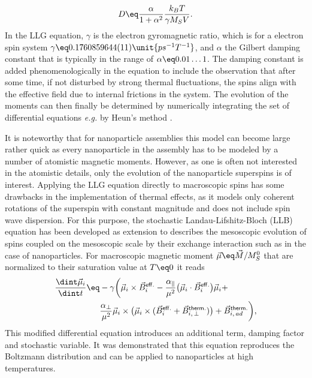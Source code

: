 \documentclass[\main/dresen_thesis.tex]{subfiles}
\begin{document}
      \begin{align}
        D \eq \frac{\alpha}{1 + \alpha^2} \frac{k_B T}{\gamma M_S V}.
      \end{align}
      In the LLG equation, $\gamma$ is the electron gyromagnetic ratio, which is for a electron spin system $\gamma \eq 0.1760859644(11) \unit{ps^{-1} T^{-1}}$, and $\alpha$ the Gilbert damping constant that is typically in the range of $\alpha \eq 0.01 \ldots 1$.
      The damping constant is added phenomenologically in the equation to include the observation that after some time, if not disturbed by strong thermal fluctuations, the spins align with the effective field due to internal frictions in the system.
      The evolution of the moments can then finally be determined by numerically integrating the set of differential equations \textit{e.g.} by Heun's method \cite{Sueli_2003_Anint}.

      It is noteworthy that for nanoparticle assemblies this model can become large rather quick as every nanoparticle in the assembly has to be modeled by a number of atomistic magnetic moments.
      However, as one is often not interested in the atomistic details, only the evolution of the nanoparticle superspins is of interest.
      Applying the LLG equation directly to macroscopic spins has some drawbacks in the implementation of thermal effects, as it models only coherent rotations of the superspin with constant magnitude and does not include spin wave dispersion.
      For this purpose, the stochastic Landau-Lifshitz-Bloch (LLB) equation \cite{Evans_2012_Stoch, Atxitia_2017_Funda} has been developed as extension to describes the mesoscopic evolution of spins coupled on the mesoscopic scale by their exchange interaction such as in the case of nanoparticles. For macroscopic magnetic moment $\vec{\mu} \eq \vec{M} / M_S^0$ that are normalized to their saturation value at $T \eq 0$ it reads
      \begin{align}
        \begin{split}
          \frac{\dint \vec{\mu}_i}{\dint t} \eq&
            - \gamma \biggl(
              \vec{\mu}_i \times \vec{B}_i^\mathsf{eff.} -
              \frac{\alpha_\parallel}{\mu^2} \bigl(\vec{\mu}_i \cdot \vec{B}_i^\mathsf{eff.} \bigr) \vec{\mu}_i +\\
              &\frac{\alpha_\bot}{\mu^2} \vec{\mu}_i \times \bigl(\vec{\mu}_i \times (\vec{B}_i^\mathsf{eff.} + \vec{B}^\mathsf{therm.}_{i, \, \bot}) \bigr) +  \vec{B}^\mathsf{therm.}_{i, \, ad} \biggr),
        \end{split}
      \end{align}
      This modified differential equation introduces an additional term, damping factor and stochastic variable.
      It was demonstrated that this equation reproduces the Boltzmann distribution and can be applied to nanoparticles at high temperatures.
\end{document}
